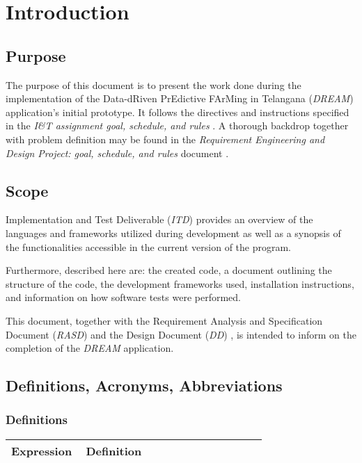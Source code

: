 \chapter{Introduction}

\section{Purpose}

The purpose of this document is to present the work done during the implementation of the Data-dRiven PrEdictive FArMing in Telangana (\textit{DREAM}) application's initial prototype. It follows the directives and instructions specified in the \textit{I\&T assignment goal, schedule, and rules} \cite{reference_doc2}. A thorough backdrop together with problem definition may be found in the \textit{Requirement Engineering and Design Project: goal, schedule, and rules} document \cite{reference_doc}.

\section{Scope}

Implementation and Test Deliverable (\textit{ITD}) provides an overview of the languages and frameworks utilized during development as well as a synopsis of the functionalities accessible in the current version of the program.

Furthermore, described here are: the created code, a document outlining the structure of the code, the development frameworks used, installation instructions, and information on how software tests were performed.

This document, together with the Requirement Analysis and Specification Document (\textit{RASD}) \cite{rasd} and the Design Document (\textit{DD}) \cite{dd}, is intended to inform on the completion of the \textit{DREAM} application.

\section{Definitions, Acronyms, Abbreviations}

\subsection{Definitions}

\begin{center}
    \begin{longtable}{@{}p{0.28\linewidth} p{0.68\linewidth}@{}}
		\toprule
		\textbf{Expression}     & \textbf{Definition}\\
		
		\midrule

	\end{longtable}
\end{center}

